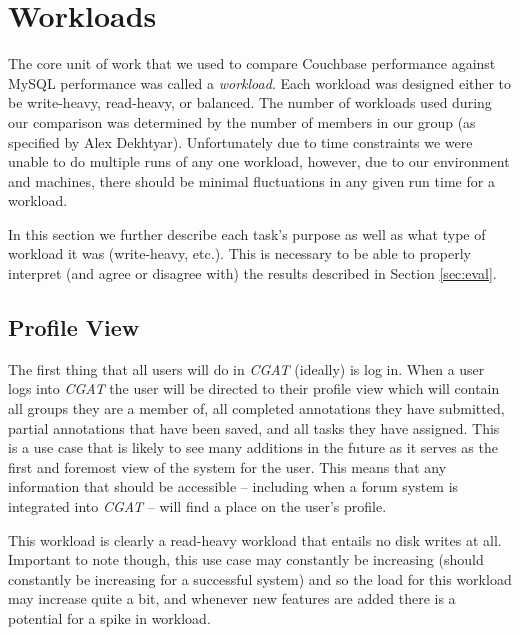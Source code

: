 \documentclass[]{IEEEtran}
\begin{document}
\clearpage

\section{Workloads}\label{sec:workload}
The core unit of work that we used to compare Couchbase performance against
MySQL performance was called a \textit{workload}. Each workload was designed
either to be write-heavy, read-heavy, or balanced. The number of workloads used
during our comparison was determined by the number of members in our group (as
specified by Alex Dekhtyar). Unfortunately due to time constraints we were
unable to do multiple runs of any one workload, however, due to our environment
and machines, there should be minimal fluctuations in any given run time for a
workload.

In this section we further describe each task's purpose as well as what type of
workload it was (write-heavy, etc.). This is necessary to be able to properly
interpret (and agree or disagree with) the results described in Section
\ref{sec:eval}.

\subsection{Profile View}
The first thing that all users will do in \textit{CGAT} (ideally) is log in.
When a user logs into \textit{CGAT} the user will be directed to their profile
view which will contain all groups they are a member of, all completed
annotations they have submitted, partial annotations that have been saved, and
all tasks they have assigned. This is a use case that is likely to see many
additions in the future as it serves as the first and foremost view of the
system for the user. This means that any information that should be accessible
-- including when a forum system is integrated into \textit{CGAT} -- will find
a place on the user's profile.

This workload is clearly a read-heavy workload that entails no disk writes at
all. Important to note though, this use case may constantly be increasing
(should constantly be increasing for a successful system) and so the load for
this workload may increase quite a bit, and whenever new features are added
there is a potential for a spike in workload.
\end{document}
